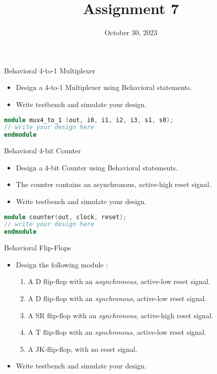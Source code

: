 \documentclass{vhdl-assignment}
\title{Assignment 7}
\date{October 30, 2023}
\begin{document}
\maketitle
\thispagestyle{fancy}

\begin{problem}{Behavioral 4-to-1 Multiplexer}
    \begin{itemize}
        \item Design a 4-to-1 Multiplexer using Behavioral statements.
        \item Write testbench and simulate your design.
    \end{itemize}

    \begin{lstlisting}[language=Verilog, numbers=none]
module mux4_to_1 (out, i0, i1, i2, i3, s1, s0);
// write your design here
endmodule
\end{lstlisting}
\end{problem}

\begin{problem}{Behavioral 4-bit Counter}
    \begin{itemize}
        \item Design a 4-bit Counter using Behavioral statements.
        \item The counter contains an asynchronous, active-high reset signal.
        \item Write testbench and simulate your design.
    \end{itemize}
        \begin{lstlisting}[language=Verilog, numbers=none]
module counter(out, clock, reset);
// write your design here
endmodule
\end{lstlisting}
\end{problem}

\begin{problem}{Behavioral Flip-Flops}
    \begin{itemize}
        \item Design the following module :
        \begin{enumerate}
            \item A D flip-flop with an \emph{asynchronous}, active-low reset signal.
            \item A D flip-flop with an \emph{synchronous}, active-low reset signal.
            \item A SR flip-flop with an \emph{synchronous}, active-high reset signal.
            \item A T flip-flop with an \emph{synchronous}, active-low reset signal.
            \item A JK-flip-flop, with no reset signal.
        \end{enumerate}
        \item Write testbench and simulate your design.
    \end{itemize}
\end{problem}
\end{document}
